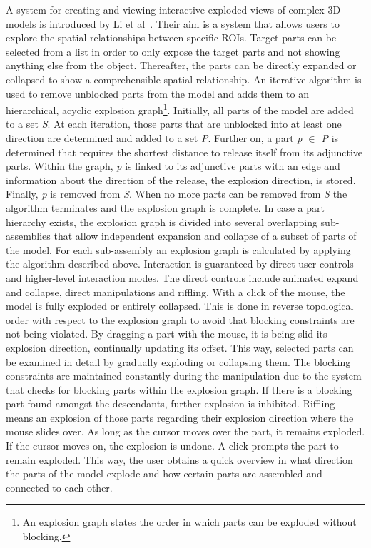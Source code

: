 A system for creating and viewing interactive exploded views of complex 3D models is introduced by Li et al~\cite{jour:generationExplodedView}. Their aim is a system that allows users to explore the spatial relationships between specific ROIs. Target parts can be selected from a list in order to only expose the target parts and not showing anything else from the object. Thereafter, the parts can be directly expanded or collapsed to show a comprehensible spatial relationship. An iterative algorithm is used to remove unblocked parts from the model and adds them to an hierarchical, acyclic explosion graph\footnote{An explosion graph states the order in which parts can be exploded without blocking.}. Initially, all parts of the model are added to a set \emph{S}. At each iteration, those parts that are unblocked into at least one direction are determined and added to a set \emph{P}. Further on, a part \emph{p $\in$ P} is determined that requires the shortest distance to release itself from its adjunctive parts. Within the graph, \emph{p} is linked to its adjunctive parts with an edge and information about the direction of the release, the explosion direction, is stored. Finally, \emph{p} is removed from \emph{S}. When no more parts can be removed from \emph{S} the algorithm terminates and the explosion graph is complete. In case a part hierarchy exists, the explosion graph is divided into several overlapping sub-assemblies that allow independent expansion and collapse of a subset of parts of the model. For each sub-assembly an explosion graph is calculated by applying the algorithm described above. Interaction is guaranteed by direct user controls and higher-level interaction modes. The direct controls include animated expand and collapse, direct manipulations and riffling. With a click of the mouse, the model is fully exploded or entirely collapsed. This is done in reverse topological order with respect to the explosion graph to avoid that blocking constraints are not being violated. By dragging a part with the mouse, it is being slid its explosion direction, continually updating its offset. This way, selected parts can be examined in detail by gradually exploding or collapsing them. The blocking constraints are maintained constantly during the manipulation due to the system that checks for blocking parts within the explosion graph. If there is a blocking part found amongst the descendants, further explosion is inhibited. Riffling means an explosion of those parts regarding their explosion direction where the mouse slides over. As long as the cursor moves over the part, it remains exploded. If the cursor moves on, the explosion is undone. A click prompts the part to remain exploded. This way, the user obtains a quick overview in what direction the parts of the model explode and how certain parts are assembled and connected to each other.

